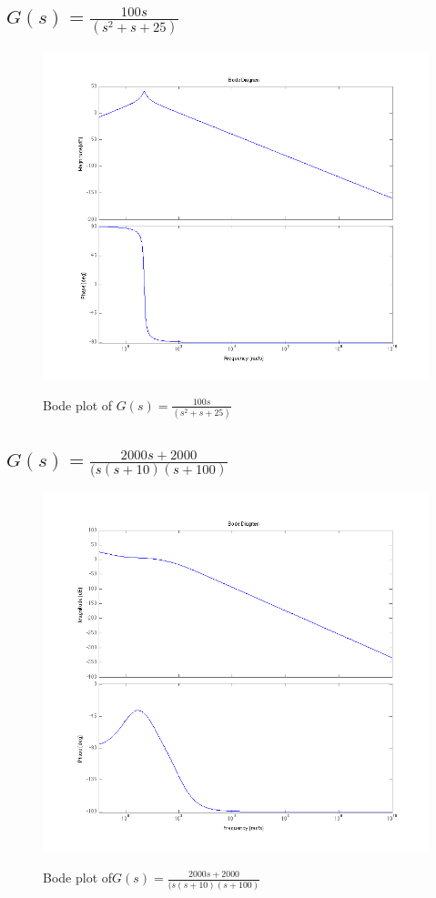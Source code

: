 \documentclass[english]{article}
\begin{document}
\subsection{$G(s) = \frac{100s}{ (s^2 +s +25)} $}
\begin{figure}[!ht]
\includegraphics[width = \linewidth]{2c.png}
\label{fig:2_c}
\caption{Bode plot of $G(s) = \frac{100s}{ (s^2 +s +25)} $}
\end{figure}
\FloatBarrier

\subsection{$G(s) = \frac{2000s + 2000}{ (s(s+10)(s+100)} $}
\begin{figure}[!ht]
\includegraphics[width = \linewidth]{2d.png}
\label{fig:2_d}
\caption{Bode plot of$G(s) = \frac{2000s + 2000}{ (s(s+10)(s+100)} $}
\end{figure}
\FloatBarrier
\end{document}
